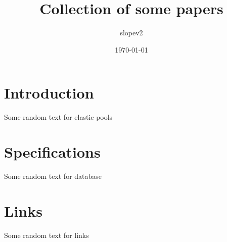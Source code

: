 \documentclass{article}
\title{Collection of some papers}
\author{slopev2}
\date{\today}
\begin{document}
	\section{Introduction}
	Some random text for elastic pools\cite{ramakrishnan2000database}
	\lipsum[1-2]
	
	\section{Specifications}
	Some random text for database
	
	\section{Links}
	Some random text for links
	
	
	
	
\end{document}

